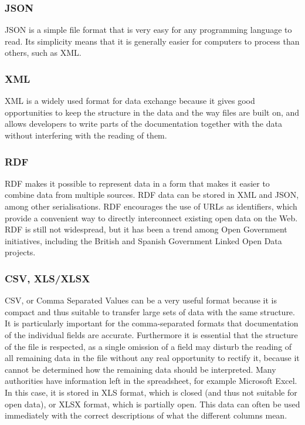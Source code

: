 \documentclass[thesis=B,english]{sprlajur-slovakopendata}[2018/05/12]
\begin{document}
\subsubsection*{JSON}
JSON is a simple file format that is very easy for any programming language to read. Its simplicity means that it is generally easier for computers to process than others, such as XML.
\subsubsection*{XML}
XML is a widely used format for data exchange because it gives good opportunities to keep the structure in the data and the way files are built on, and allows developers to write parts of the documentation together with the data without interfering with the reading of them.
\subsubsection*{RDF} 	
RDF makes it possible to represent data in a form that makes it easier to combine data from multiple sources. RDF data can be stored in XML and JSON, among other serialisations. RDF encourages the use of URLs as identifiers, which provide a convenient way to directly interconnect existing open data on the Web. RDF is still not widespread, but it has been a trend among Open Government initiatives, including the British and Spanish Government Linked Open Data projects.
\subsubsection{CSV, XLS/XLSX}
CSV, or Comma Separated Values can be a very useful format because it is compact and thus suitable to transfer large sets of data with the same structure. It is particularly important for the comma-separated formats that documentation of the individual fields are accurate.
Furthermore it is essential that the structure of the file is respected, as a single omission of a field may disturb the reading of all remaining data in the file without any real opportunity to rectify it, because it cannot be determined how the remaining data should be interpreted.
Many authorities have information left in the spreadsheet, for example Microsoft Excel. In this case, it is stored in XLS format, which is closed (and thus not suitable for open data), or XLSX format, which is partially open. This data can often be used immediately with the correct descriptions of what the different columns mean.
\end{document}
